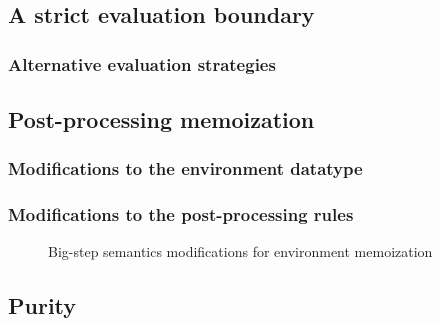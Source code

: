 \subsection{A strict evaluation boundary}
\label{sec:strict_eval_boundary}


\subsubsection{Alternative evaluation strategies}
\label{sec:pattern_nomatch_strategies}


\subsection{Post-processing memoization}
\label{sec:memoization}

\subsubsection{Modifications to the environment datatype}
\label{sec:memoization-evalenv}

\subsubsection{Modifications to the post-processing rules}
\label{sec:memoization-postprocessing}

\begin{figure}
  \centering
  \begin{mdframed}
    \begin{singlespace}
      
    \end{singlespace}
  \end{mdframed}
  \caption{Big-step semantics modifications for environment memoization}
  \label{fig:big-step-memoization-rules}
\end{figure}

\subsection{Purity}
\label{sec:env-purity}



